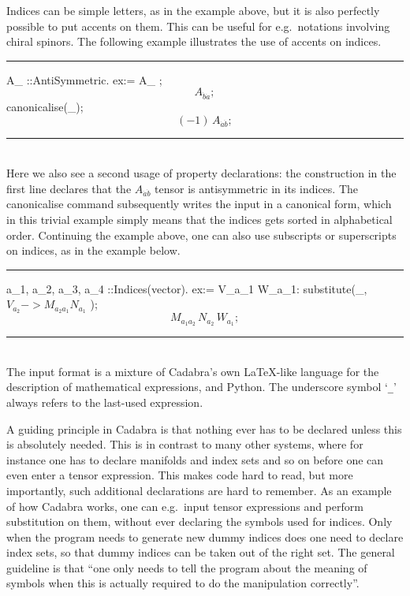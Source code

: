 \documentclass[11pt]{article}
\newcommand{\toprule}{\par\vspace{1ex}\noindent\hspace{25pt}\rule{435pt}{.1pt}}
\newcommand{\botrule}{\noindent\hspace{25pt}\rule{435pt}{.1pt}\\[2ex]}
\newenvironment{cdbin}{\fvset{firstnumber=1}\color[named]{Blue}\Verbatim}{\endVerbatim}
\newenvironment{cdbcont}{\fvset{firstnumber=last}\color[named]{Blue}\Verbatim}{\endVerbatim}
\newenvironment{cdbout}{\vspace{-1ex}\begin{equation}}{\end{equation}\vspace{-1ex}}
\newcommand{\Cdb}{{Cadabra}\xspace}
\begin{document}
Indices can be simple letters, as in the example above, but it is also
perfectly possible to put accents on them. This can be useful for
e.g.~notations involving chiral spinors. The following example
illustrates the use of accents on indices.
\toprule
\begin{cdbin}
A_{ }::AntiSymmetric.
ex:= A_{ };
\end{cdbin}
\begin{cdbout}
A_{\dot{b} \dot{a}};
\end{cdbout}
\begin{cdbcont}
canonicalise(_);
\end{cdbcont}
\begin{cdbout}
(-1)\,A_{\dot{a} \dot{b}};
\end{cdbout}
\botrule Here we also see a second usage of property declarations: the
construction in the first line declares that the $A_{\dot{a} \dot{b}}$
tensor is antisymmetric in its indices. The canonicalise command
subsequently writes the input in a canonical form, which in this
trivial example simply means that the indices gets sorted in
alphabetical order.  Continuing the example above, one can also use
subscripts or superscripts on indices, as in the example below.
\vfill\eject
\toprule
\begin{cdbin}
{ a_{1}, a_{2}, a_{3}, a_{4} }::Indices(vector).
ex:= V_{a_{1}} W_{a_{1}}:
substitute(_, $V_{a_{2}} -> M_{a_{2} a_{1}} N_{a_{1}}$ );
\end{cdbin}
\begin{cdbout}
M_{a_{1} a_{2}} \, N_{a_{2}} \, W_{a_{1}};
\end{cdbout}
\botrule
The input format is a mixture of Cadabra's own LaTeX-like language for
the description of mathematical expressions, and Python. The
underscore symbol `\verb|_|' always refers to the last-used expression.

A guiding principle in \Cdb is that nothing ever has to be declared
unless this is absolutely needed. This is in contrast to many other
systems, where for instance one has to declare manifolds and index
sets and so on before one can even enter a tensor expression. This
makes code hard to read, but more importantly, such additional
declarations are hard to remember. As an example of how \Cdb works,
one can e.g.~input tensor expressions and perform substitution on them,
without ever declaring the symbols used for indices. Only when the
program needs to generate new dummy indices does one need to declare
index sets, so that dummy indices can be taken out of the right
set. The general guideline is that ``one only
needs to tell the program about the meaning of symbols when this is
actually required to do the manipulation correctly''.
\end{document}
